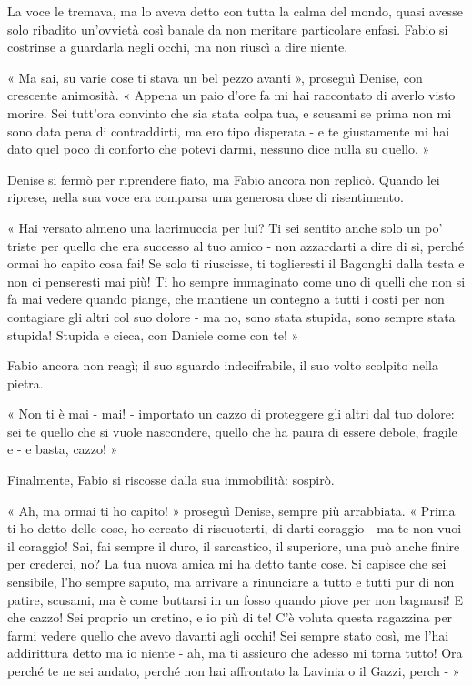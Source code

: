 La voce le tremava, ma lo aveva detto con tutta la calma del mondo, quasi avesse solo ribadito un'ovvietà così banale da non meritare particolare enfasi. Fabio si costrinse a guardarla negli occhi, ma non riuscì a dire niente.

« Ma sai, su varie cose ti stava un bel pezzo avanti », proseguì Denise, con crescente animosità. « Appena un paio d'ore fa mi hai raccontato di averlo visto morire. Sei tutt'ora convinto che sia stata colpa tua, e scusami se prima non mi sono data pena di contraddirti, ma ero tipo disperata - e te giustamente mi hai dato quel poco di conforto che potevi darmi, nessuno dice nulla su quello. »

Denise si fermò per riprendere fiato, ma Fabio ancora non replicò. Quando lei riprese, nella sua voce era comparsa una generosa dose di risentimento.

« Hai versato almeno una lacrimuccia per lui? Ti sei sentito anche solo un po' triste per quello che era successo al tuo amico - non azzardarti a dire di sì, perché ormai ho capito cosa fai! Se solo ti riuscisse, ti toglieresti il Bagonghi dalla testa e non ci penseresti mai più! Ti ho sempre immaginato come uno di quelli che non si fa mai vedere quando piange, che mantiene un contegno a tutti i costi per non contagiare gli altri col suo dolore - ma no, sono stata stupida, sono sempre stata stupida! Stupida e cieca, con Daniele come con te! »

Fabio ancora non reagì; il suo sguardo indecifrabile, il suo volto scolpito nella pietra.

« Non ti è mai - mai! - importato un cazzo di proteggere gli altri dal tuo dolore: sei te quello che si vuole nascondere, quello che ha paura di essere debole, fragile e - e basta, cazzo! »

Finalmente, Fabio si riscosse dalla sua immobilità: sospirò.

« Ah, ma ormai ti ho capito! » proseguì Denise, sempre più arrabbiata. « Prima ti ho detto delle cose, ho cercato di riscuoterti, di darti coraggio - ma te non vuoi il coraggio! Sai, fai sempre il duro, il sarcastico, il superiore, una può anche finire per crederci, no? La tua nuova amica mi ha detto tante cose. Si capisce che sei sensibile, l'ho sempre saputo, ma arrivare a rinunciare a tutto e tutti pur di non patire, scusami, ma è come buttarsi in un fosso quando piove per non bagnarsi! E che cazzo! Sei proprio un cretino, e io più di te! C'è voluta questa ragazzina per farmi vedere quello che avevo davanti agli occhi! Sei sempre stato così, me l'hai addirittura detto ma io niente - ah, ma ti assicuro che adesso mi torna tutto! Ora perché te ne sei andato, perché non hai affrontato la Lavinia o il Gazzi, perch - »


